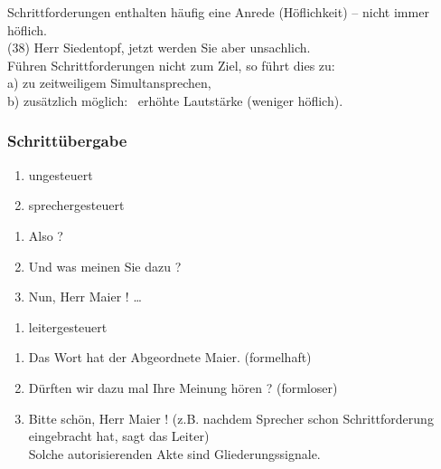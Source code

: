 \documentclass[
  letterpaper,
]{scrbook}
\providecommand{\tightlist}{%
  \setlength{\itemsep}{0pt}\setlength{\parskip}{0pt}}\usepackage{longtable,booktabs,array}
\begin{document}
Schrittforderungen enthalten häufig eine Anrede (Höflichkeit) -- nicht
immer höflich.\\
(38) Herr Siedentopf, jetzt werden Sie aber unsachlich.\\

Führen Schrittforderungen nicht zum Ziel, so führt dies zu:\\
a) zu zeitweiligem Simultansprechen,\\
b) zusätzlich möglich: ~erhöhte Lautstärke (weniger höflich).\\

\hypertarget{schrittuxfcbergabe}{%
\subsubsection{Schrittübergabe}\label{schrittuxfcbergabe}}

\begin{enumerate}
\def\labelenumi{\alph{enumi})}
\tightlist
\item
  ungesteuert\\
\item
  sprechergesteuert\\
\end{enumerate}

\begin{enumerate}
\def\labelenumi{(\arabic{enumi})}
\setcounter{enumi}{38}
\tightlist
\item
  Also ?\\
\item
  Und was meinen Sie dazu ?\\
\item
  Nun, Herr Maier ! \ldots{}\\
\end{enumerate}

\begin{enumerate}
\def\labelenumi{\alph{enumi})}
\setcounter{enumi}{2}
\tightlist
\item
  leitergesteuert\\
\end{enumerate}

\begin{enumerate}
\def\labelenumi{(\arabic{enumi})}
\setcounter{enumi}{41}
\tightlist
\item
  Das Wort hat der Abgeordnete Maier. (formelhaft)\\
\item
  Dürften wir dazu mal Ihre Meinung hören ? (formloser)\\
\item
  Bitte schön, Herr Maier ! (z.B. nachdem Sprecher schon
  Schrittforderung eingebracht hat, sagt das Leiter)\\
  Solche autorisierenden Akte sind Gliederungssignale.\\
\end{enumerate}
\end{document}
